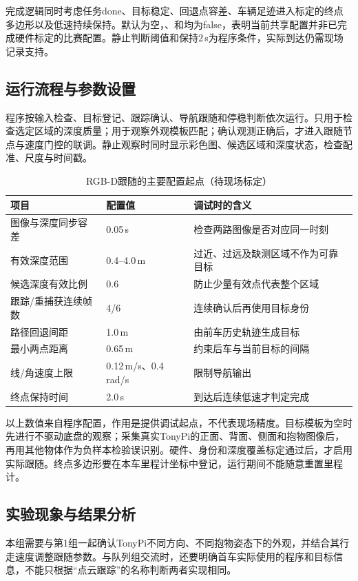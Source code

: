 完成逻辑同时考虑任务done、目标稳定、回退点容差、车辆足迹进入标定的终点多边形以及低速持续保持。默认为空，、和均为false，表明当前共享配置并非已完成硬件标定的比赛配置。静止判断阈值和保持2\,s为程序条件，实际到达仍需现场记录支持。

\subsection{运行流程与参数设置}
程序按输入检查、目标登记、跟踪确认、导航跟随和停稳判断依次运行。只用于检查选定区域的深度质量；用于观察外观模板匹配；确认观测正确后，才进入跟随节点与速度门控的联调。静止观察时同时显示彩色图、候选区域和深度状态，检查配准、尺度与时间戳。

\begin{table}[H]\centering\small
\caption{RGB-D跟随的主要配置起点（待现场标定）}
\begin{tabularx}{\linewidth}{p{48mm}p{25mm}Y}\toprule
项目 & 配置值 & 调试时的含义\\\midrule
图像与深度同步容差 & 0.05\,s & 检查两路图像是否对应同一时刻\\
有效深度范围 & 0.4--4.0\,m & 过近、过远及缺测区域不作为可靠目标\\
候选深度有效比例 & 0.6 & 防止少量有效点代表整个区域\\
跟踪/重捕获连续帧数 & 4/6 & 连续确认后再使用目标身份\\
路径回退间距 & 1.0\,m & 由前车历史轨迹生成目标\\
最小两点距离 & 0.65\,m & 约束后车与当前目标的间隔\\
线/角速度上限 & 0.12\,m/s、0.4\,rad/s & 限制导航输出\\
终点保持时间 & 2.0\,s & 到达后连续低速才判定完成\\\bottomrule
\end{tabularx}\end{table}
以上数值来自程序配置，作用是提供调试起点，不代表现场精度。目标模板为空时先进行不驱动底盘的观察；采集真实TonyPi的正面、背面、侧面和抱物图像后，再用其他物体作为负样本检验误识别。硬件、身份和深度覆盖标定通过后，才启用实际跟随。终点多边形要在本车里程计坐标中登记，运行期间不能随意重置里程计。

\subsection{实验现象与结果分析}
本组需要与第1组一起确认TonyPi不同方向、不同抱物姿态下的外观，并结合其行走速度调整跟随参数。与队列组交流时，还要明确首车实际使用的程序和目标信息，不能只根据“点云跟踪”的名称判断两者实现相同。

